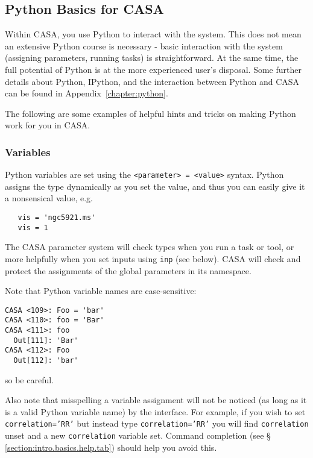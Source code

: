 \subsection{Python Basics for CASA}
\label{section:intro.basics.python}

Within CASA, you use Python to interact with the system.  This does
not mean an extensive Python course is necessary - basic interaction
with the system (assigning parameters, running tasks) is
straightforward.  At the same time, the full potential of Python is at
the more experienced user's disposal.  Some further details about
Python, IPython, and the interaction between Python and CASA can be
found in Appendix~\ref{chapter:python}.

The following are some examples of helpful hints and tricks on making
Python work for you in CASA.

\subsubsection{Variables}
\label{section:intro.basics.python.var}

Python variables are set using the {\tt <parameter> = <value>} 
syntax.  Python assigns the type dynamically as you set the value,
and thus you can easily give it a nonsensical value, e.g. 
\small
\begin{verbatim}
   vis = 'ngc5921.ms'
   vis = 1
\end{verbatim}
\normalsize
The CASA parameter system will check types when you run a task or
tool, or more helpfully when you set inputs using {\tt inp} (see
below).  CASA will check and protect the assignments of the global
parameters in its namespace.

Note that Python variable names are case-sensitive:
\small
\begin{verbatim}
CASA <109>: Foo = 'bar'
CASA <110>: foo = 'Bar'
CASA <111>: foo
  Out[111]: 'Bar'
CASA <112>: Foo
  Out[112]: 'bar'
\end{verbatim}
\normalsize
so be careful.  

Also note that misspelling a variable assignment
will not be noticed (as long as it is a valid Python variable name)
by the interface.  For example, if you wish to set 
{\tt correlation='RR'} but instead type {\tt correlation='RR'}
you will find {\tt correlation} unset and a new {\tt correlation}
variable set.  Command completion (see
\S\,\ref{section:intro.basics.help.tab}) should help you avoid this.


